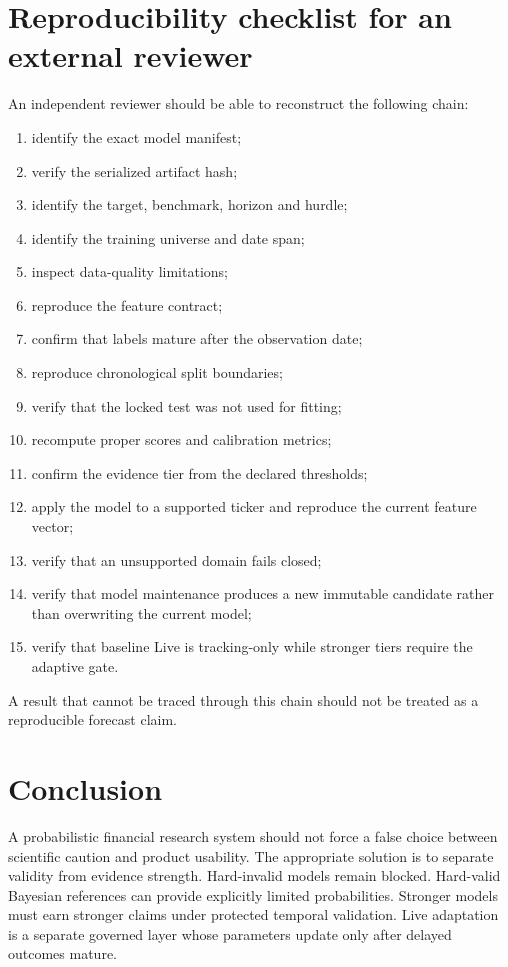 \documentclass[11pt]{article}
\begin{document}
\section{Reproducibility checklist for an external reviewer}
An independent reviewer should be able to reconstruct the following chain:
\begin{enumerate}[itemsep=0.2em]
\item identify the exact model manifest;
\item verify the serialized artifact hash;
\item identify the target, benchmark, horizon and hurdle;
\item identify the training universe and date span;
\item inspect data-quality limitations;
\item reproduce the feature contract;
\item confirm that labels mature after the observation date;
\item reproduce chronological split boundaries;
\item verify that the locked test was not used for fitting;
\item recompute proper scores and calibration metrics;
\item confirm the evidence tier from the declared thresholds;
\item apply the model to a supported ticker and reproduce the current feature vector;
\item verify that an unsupported domain fails closed;
\item verify that model maintenance produces a new immutable candidate rather than overwriting the current model;
\item verify that baseline Live is tracking-only while stronger tiers require the adaptive gate.
\end{enumerate}

A result that cannot be traced through this chain should not be treated as a reproducible forecast claim.

\section{Conclusion}
A probabilistic financial research system should not force a false choice between scientific caution and product usability. The appropriate solution is to separate validity from evidence strength. Hard-invalid models remain blocked. Hard-valid Bayesian references can provide explicitly limited probabilities. Stronger models must earn stronger claims under protected temporal validation. Live adaptation is a separate governed layer whose parameters update only after delayed outcomes mature.
\end{document}
